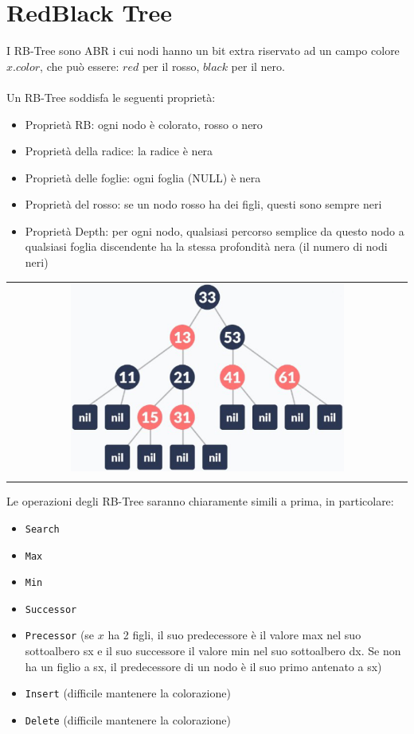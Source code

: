 \section{RedBlack Tree}
I RB-Tree sono ABR i cui nodi hanno un bit extra riservato ad un campo colore $x.color$, che può essere: $red$ per il rosso, $black$ per il nero. \\~\\
Un RB-Tree soddisfa le seguenti proprietà:
\begin{itemize}
    \item Proprietà RB: ogni nodo è colorato, rosso o nero
    \item Proprietà della radice: la radice è nera
    \item Proprietà delle foglie: ogni foglia (NULL) è nera
    \item Proprietà del rosso: se un nodo rosso ha dei figli, questi sono sempre neri
    \item Proprietà Depth: per ogni nodo, qualsiasi percorso semplice da questo nodo a qualsiasi foglia discendente ha la stessa profondità nera (il numero di nodi neri)
\end{itemize}
\begin{center}
    \begin{tabular}{c}
        \\ \includegraphics[width=0.7\textwidth]{image/RB-Tree.png} \\ \\
    \end{tabular}
\end{center}
Le operazioni degli RB-Tree saranno chiaramente simili a prima, in particolare:
\begin{itemize}
    \item \verb|Search|
    \item \verb|Max|
    \item \verb|Min|
    \item \verb|Successor|
    \item \verb|Precessor| (se $x$ ha 2 figli, il suo predecessore è il valore max nel suo sottoalbero sx e il suo successore il valore min nel suo sottoalbero dx. Se non ha un figlio a sx, il predecessore di un nodo è il suo primo antenato a sx)
    \item \verb|Insert| (difficile mantenere la colorazione)
    \item \verb|Delete| (difficile mantenere la colorazione)
\end{itemize}
